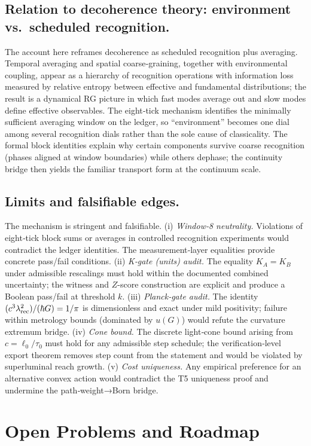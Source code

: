 \documentclass[12pt,a4paper]{article}
\theoremstyle{definition}
\theoremstyle{remark}
\begin{document}
\subsection{Relation to decoherence theory: environment vs.\ scheduled recognition.}
The account here reframes decoherence as scheduled recognition plus averaging. Temporal averaging and spatial coarse‑graining, together with environmental coupling, appear as a hierarchy of recognition operations with information loss measured by relative entropy between effective and fundamental distributions; the result is a dynamical RG picture in which fast modes average out and slow modes define effective observables. The eight‑tick mechanism identifies the minimally sufficient averaging window on the ledger, so ``environment'' becomes one dial among several recognition dials rather than the sole cause of classicality. The formal block identities explain why certain components survive coarse recognition (phases aligned at window boundaries) while others dephase; the continuity bridge then yields the familiar transport form at the continuum scale.

\subsection{Limits and falsifiable edges.}
The mechanism is stringent and falsifiable. 
(i) \emph{Window‑8 neutrality.} Violations of eight‑tick block sums or averages in controlled recognition experiments would contradict the ledger identities. The measurement‑layer equalities provide concrete pass/fail conditions. 
(ii) \emph{K‑gate (units) audit.} The equality \(K_A=K_B\) under admissible rescalings must hold within the document\-ed combined uncertainty; the witness and \(Z\)-score construction are explicit and produce a Boolean pass/fail at threshold \(k\). 
(iii) \emph{Planck‑gate audit.} The identity \((c^3\lambda_{\rm rec}^2)/(\hbar G)=1/\pi\) is dimensionless and exact under mild positivity; failure within metrology bounds (dominated by \(u(G)\)) would refute the curvature extremum bridge. 
(iv) \emph{Cone bound.} The discrete light‑cone bound arising from \(c=\ell_0/\tau_0\) must hold for any admissible step schedule; the verification‑level export theorem removes step count from the statement and would be violated by superluminal reach growth. 
(v) \emph{Cost uniqueness.} Any empirical preference for an alternative convex action would contradict the T5 uniqueness proof and undermine the path‑weight→Born bridge. 

\section{Open Problems and Roadmap}
\end{document}
